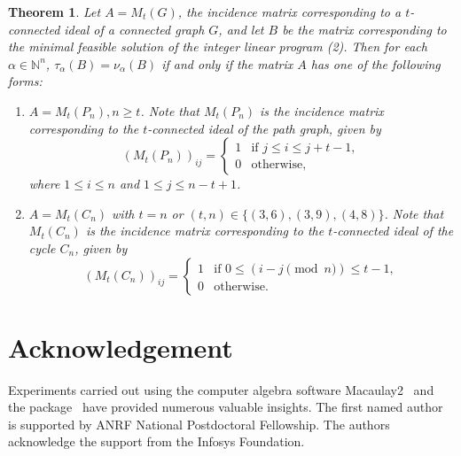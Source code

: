 \documentclass[12pt]{amsart}
\newtheorem{theorem}[proposition]{Theorem}
\begin{document}
\begin{theorem}
    Let $A=M_t(G)$, the incidence matrix corresponding to a $t$-connected ideal of a connected graph $G$, and let $B$ be the matrix corresponding to the minimal feasible solution of the integer linear program (2). Then for each $\alpha\in \mathbb{N}^n$, $\tau_{\alpha}(B)=\nu_{\alpha}(B)$ if and only if the matrix $A$ has one of the following forms: 
\begin{enumerate}
    \item $A=M_t(P_n), n\geq t$. Note that $M_t(P_n)$ is the incidence matrix corresponding to the $t$-connected ideal of the path graph, given by 
    \[
        (M_t(P_n))_{ij}=
        \begin{cases}
        1 & \text{if } j \le i \le j+t-1,\\
        0 & \text{otherwise},
        \end{cases}
    \]
    where $1\le i\le n$ and $1\le j\le n-t+1$.

    \item $A=M_t(C_n)$ with $t=n$ or $(t,n)\in \{(3,6),(3,9), (4,8)\}$. Note that $M_t(C_n)$ is the incidence matrix corresponding to the $t$-connected ideal of the cycle $C_n$, given by
    \[
    (M_t(C_n))_{ij}=
    \begin{cases}
    1 & \text{if } 0 \le (i-j \pmod n) \le t-1, \\
    0 & \text{otherwise}.
    \end{cases}
    \]
    
\end{enumerate}

\end{theorem}


\section*{Acknowledgement}
Experiments carried out using the computer algebra software Macaulay2~\cite{M2} and the package~\cite{SymbolicPowersSource} have provided numerous valuable insights. The first named author is supported by ANRF National Postdoctoral Fellowship. The authors acknowledge the support from the Infosys Foundation.   

















%
%
\end{document}
